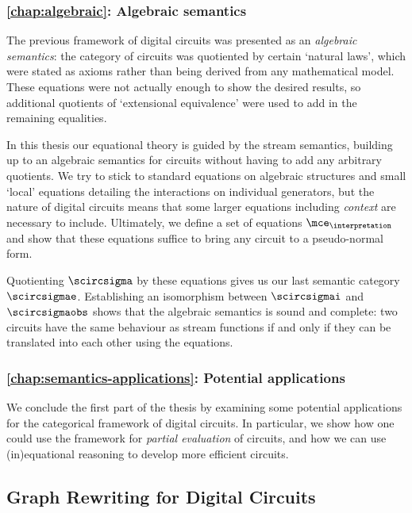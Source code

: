 \subsubsection{\cref{chap:algebraic}: Algebraic semantics}

The previous framework of digital circuits was presented as an
\emph{algebraic semantics}: the category of circuits was quotiented by certain
`natural laws', which were stated as axioms rather than being derived from any
mathematical model.
These equations were not actually enough to show the desired results, so
additional quotients of `extensional equivalence' were used to add in the
remaining equalities.

In this thesis our equational theory is guided by the stream semantics,
building up to an algebraic semantics for circuits without having to add any
arbitrary quotients.
We try to stick to standard equations on algebraic structures and small `local'
equations detailing the interactions on individual generators, but the nature of
digital circuits means that some larger equations including \emph{context} are
necessary to include.
Ultimately, we define a set of equations \(\mce_\interpretation\) and show that
these equations suffice to bring any circuit to a pseudo-normal form.

Quotienting \(\scircsigma\) by these equations gives us our last semantic
category \(\scircsigmae\).
Establishing an isomorphism between \(\scircsigmai\)
and \(\scircsigmaobs\) shows that the algebraic semantics is sound and complete:
two circuits have the same behaviour as stream functions if and only if they
can be translated into each other using the equations.

\subsubsection{\cref{chap:semantics-applications}: Potential applications}

We conclude the first part of the thesis by examining some potential
applications for the categorical framework of digital circuits.
In particular, we show how one could use the framework for
\emph{partial evaluation} of circuits, and how we can use (in)equational
reasoning to develop more efficient circuits.

\subsection{Graph Rewriting for Digital Circuits}

